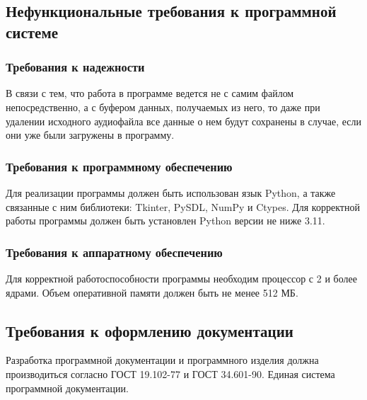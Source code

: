 \subsection{Нефункциональные требования к программной системе}

\subsubsection{Требования к надежности}
В связи с тем, что работа в программе ведется не с самим файлом непосредственно, а с буфером данных, получаемых из него,
то даже при удалении исходного аудиофайла все данные о нем будут сохранены в случае, если они уже были загружены в программу.

\subsubsection{Требования к программному обеспечению}
Для реализации программы должен быть использован язык Python, а также связанные с ним библиотеки: Tkinter, PySDL, NumPy и Ctypes. Для корректной работы программы должен быть установлен Python версии не ниже 3.11.

\subsubsection{Требования к аппаратному обеспечению}
Для корректной работоспособности программы необходим процессор с 2 и более ядрами.
Объем оперативной памяти должен быть не менее 512 МБ.

\subsection{Требования к оформлению документации}

Разработка программной документации и программного изделия должна производиться согласно ГОСТ 19.102-77 и ГОСТ 34.601-90. Единая система программной документации.
